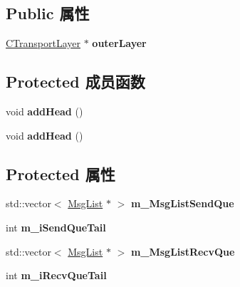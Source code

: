 \subsection*{Public 属性}
\begin{DoxyCompactItemize}
\item 
\mbox{\label{class_c_u_d_p_a4c0a9bc6c679d857a3461a3a71ba8abd}} 
\hyperlink{class_c_transport_layer}{C\+Transport\+Layer} $\ast$ {\bfseries outer\+Layer}
\end{DoxyCompactItemize}
\subsection*{Protected 成员函数}
\begin{DoxyCompactItemize}
\item 
\mbox{\label{class_c_u_d_p_a445c3b7fe1b58e8b278115649ad25c3f}} 
void {\bfseries add\+Head} ()
\item 
\mbox{\label{class_c_u_d_p_a445c3b7fe1b58e8b278115649ad25c3f}} 
void {\bfseries add\+Head} ()
\end{DoxyCompactItemize}
\subsection*{Protected 属性}
\begin{DoxyCompactItemize}
\item 
\mbox{\label{class_c_u_d_p_adc6c3097ec9ab885987b058ef3b1e26f}} 
std\+::vector$<$ \hyperlink{class_msg_list}{Msg\+List} $\ast$ $>$ {\bfseries m\+\_\+\+Msg\+List\+Send\+Que}
\item 
\mbox{\label{class_c_u_d_p_acf38f880b4ccfbff285aeaff75a931a4}} 
int {\bfseries m\+\_\+i\+Send\+Que\+Tail}
\item 
\mbox{\label{class_c_u_d_p_ae04cfd9b77ae1d4f96d83e890a1203f3}} 
std\+::vector$<$ \hyperlink{class_msg_list}{Msg\+List} $\ast$ $>$ {\bfseries m\+\_\+\+Msg\+List\+Recv\+Que}
\item 
\mbox{\label{class_c_u_d_p_ae90f37aa5c56ecf05cf6e4daacd90bba}} 
int {\bfseries m\+\_\+i\+Recv\+Que\+Tail}
\end{DoxyCompactItemize}
